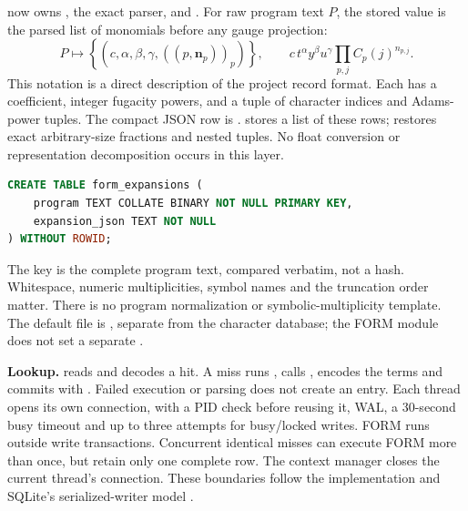 \clearpage
{}
 now owns , the exact
parser, and . For raw program text $P$, the stored value is
the parsed list of monomials before any gauge projection:
\[
 P\longmapsto \left\{\left(c,\alpha,\beta,\gamma,
        ((p,\mathbf n_p))_p\right)\right\},\qquad
 c\,t^\alpha y^\beta u^\gamma\prod_{p,j}C_p(j)^{n_{p,j}}.
\]
This notation is a direct description of the project record format. Each
 has a  coefficient, integer fugacity powers,
and a tuple of character indices and Adams-power tuples. The compact JSON row is
.
 stores a list of these rows; 
restores exact arbitrary-size fractions and nested tuples. No float conversion
or representation decomposition occurs in this layer.

\begin{lstlisting}[language=SQL]
CREATE TABLE form_expansions (
    program TEXT COLLATE BINARY NOT NULL PRIMARY KEY,
    expansion_json TEXT NOT NULL
) WITHOUT ROWID;
\end{lstlisting}
The key is the complete program text, compared verbatim, not a hash. Whitespace,
numeric multiplicities, symbol names and the truncation order matter. There is
no program normalization or symbolic-multiplicity template. The default file is
, separate from the character database; the FORM
module does not set a separate .

\textbf{Lookup.}  reads and decodes a hit. A miss
runs , calls , encodes the terms and
commits with . Failed execution or parsing
does not create an entry. Each thread opens its own connection, with a PID check
before reusing it, WAL, a 30-second busy timeout and up to three attempts for
busy/locked writes. FORM runs outside write transactions. Concurrent identical
misses can execute FORM more than once, but retain only one complete row.
The context manager closes the current thread's connection. These boundaries
follow the implementation and SQLite's serialized-writer model \cite{sqlite-wal,python-sqlite}.

